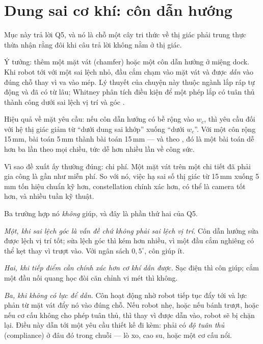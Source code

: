 \documentclass[../../marker.tex]{subfiles}
\begin{document}
\section{Dung sai cơ khí: côn dẫn hướng}

Mục này trả lời Q5, và nó là chỗ một cây tri thức về thị giác phải trung thực thừa nhận rằng đôi khi câu trả lời không nằm ở thị giác.

Ý tưởng: thêm một mặt vát (chamfer) hoặc một côn dẫn hướng ở miệng dock. Khi robot tới với một sai lệch nhỏ, đầu cắm chạm vào mặt vát và được \emph{dẫn} vào đúng chỗ thay vì va vào mép. Lý thuyết của chuyện này thuộc ngành lắp ráp tự động và đã có từ lâu; Whitney phân tích điều kiện để một phép lắp có tuân thủ thành công dưới sai lệch vị trí và góc \cite{whitney1982quasi}.

Hiệu quả về mặt yêu cầu: nếu côn dẫn hướng có bề rộng vào \(w_c\), thì yêu cầu đối với hệ thị giác giảm từ ``dưới dung sai khớp'' xuống ``dưới \(w_c\)''. Với một côn rộng 15\,mm, bài toán 5\,mm thành bài toán 15\,mm --- và theo , đó là một bài toán dễ hơn ba lần theo mọi chiều, tức dễ hơn nhiều lần về công sức.

Vì sao đề xuất ấy thường đúng: chi phí. Một mặt vát trên một chi tiết đã phải gia công là gần như miễn phí. So với nó, việc hạ sai số thị giác từ 15\,mm xuống 5\,mm tốn hiệu chuẩn kỹ hơn, constellation chính xác hơn, có thể là camera tốt hơn, và nhiều tuần kỹ thuật.

Ba trường hợp nó \emph{không} giúp, và đây là phần thứ hai của Q5.

\emph{Một, khi sai lệch góc là vấn đề chứ không phải sai lệch vị trí.} Côn dẫn hướng sửa được lệch vị trí tốt; sửa lệch góc thì kém hơn nhiều, vì một đầu cắm nghiêng có thể kẹt thay vì trượt vào. Với ngân sách \(0{,}5^\circ\), côn giúp ít.

\emph{Hai, khi tiếp điểm cần chính xác hơn cơ khí dẫn được.} Sạc điện thì côn giúp; cắm một đầu nối quang học đòi căn chỉnh vi mét thì không.

\emph{Ba, khi không có lực để dẫn.} Côn hoạt động nhờ robot tiếp tục đẩy tới và lực phản từ mặt vát đẩy nó vào đúng chỗ. Nếu robot nhẹ, hoặc nếu bánh trượt, hoặc nếu cơ cấu không cho phép tuân thủ, thì thay vì được dẫn vào, robot sẽ bị chặn lại. Điều này dẫn tới một yêu cầu thiết kế đi kèm: phải có \emph{độ tuân thủ} (compliance) ở đâu đó trong chuỗi --- lò xo, cao su, hoặc một cơ cấu nổi.
\end{document}
